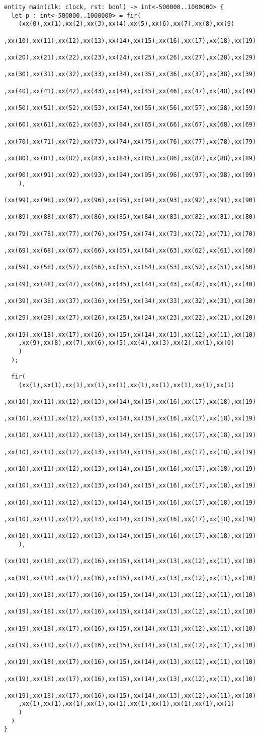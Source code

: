\documentclass[msc,lith,english]{liuthesis}
\begin{document}
\begin{verbatim}
entity main(clk: clock, rst: bool) -> int<-500000..1000000> {
  let p : int<-500000..1000000> = fir(
    (xx(0),xx(1),xx(2),xx(3),xx(4),xx(5),xx(6),xx(7),xx(8),xx(9)
    ,xx(10),xx(11),xx(12),xx(13),xx(14),xx(15),xx(16),xx(17),xx(18),xx(19)
    ,xx(20),xx(21),xx(22),xx(23),xx(24),xx(25),xx(26),xx(27),xx(28),xx(29)
    ,xx(30),xx(31),xx(32),xx(33),xx(34),xx(35),xx(36),xx(37),xx(38),xx(39)
    ,xx(40),xx(41),xx(42),xx(43),xx(44),xx(45),xx(46),xx(47),xx(48),xx(49)
    ,xx(50),xx(51),xx(52),xx(53),xx(54),xx(55),xx(56),xx(57),xx(58),xx(59)
    ,xx(60),xx(61),xx(62),xx(63),xx(64),xx(65),xx(66),xx(67),xx(68),xx(69)
    ,xx(70),xx(71),xx(72),xx(73),xx(74),xx(75),xx(76),xx(77),xx(78),xx(79)
    ,xx(80),xx(81),xx(82),xx(83),xx(84),xx(85),xx(86),xx(87),xx(88),xx(89)
    ,xx(90),xx(91),xx(92),xx(93),xx(94),xx(95),xx(96),xx(97),xx(98),xx(99)
    ),
    (xx(99),xx(98),xx(97),xx(96),xx(95),xx(94),xx(93),xx(92),xx(91),xx(90)
    ,xx(89),xx(88),xx(87),xx(86),xx(85),xx(84),xx(83),xx(82),xx(81),xx(80)
    ,xx(79),xx(78),xx(77),xx(76),xx(75),xx(74),xx(73),xx(72),xx(71),xx(70)
    ,xx(69),xx(68),xx(67),xx(66),xx(65),xx(64),xx(63),xx(62),xx(61),xx(60)
    ,xx(59),xx(58),xx(57),xx(56),xx(55),xx(54),xx(53),xx(52),xx(51),xx(50)
    ,xx(49),xx(48),xx(47),xx(46),xx(45),xx(44),xx(43),xx(42),xx(41),xx(40)
    ,xx(39),xx(38),xx(37),xx(36),xx(35),xx(34),xx(33),xx(32),xx(31),xx(30)
    ,xx(29),xx(28),xx(27),xx(26),xx(25),xx(24),xx(23),xx(22),xx(21),xx(20)
    ,xx(19),xx(18),xx(17),xx(16),xx(15),xx(14),xx(13),xx(12),xx(11),xx(10)
    ,xx(9),xx(8),xx(7),xx(6),xx(5),xx(4),xx(3),xx(2),xx(1),xx(0)
    )
  );

  fir(
    (xx(1),xx(1),xx(1),xx(1),xx(1),xx(1),xx(1),xx(1),xx(1),xx(1)
    ,xx(10),xx(11),xx(12),xx(13),xx(14),xx(15),xx(16),xx(17),xx(18),xx(19)
    ,xx(10),xx(11),xx(12),xx(13),xx(14),xx(15),xx(16),xx(17),xx(18),xx(19)
    ,xx(10),xx(11),xx(12),xx(13),xx(14),xx(15),xx(16),xx(17),xx(18),xx(19)
    ,xx(10),xx(11),xx(12),xx(13),xx(14),xx(15),xx(16),xx(17),xx(18),xx(19)
    ,xx(10),xx(11),xx(12),xx(13),xx(14),xx(15),xx(16),xx(17),xx(18),xx(19)
    ,xx(10),xx(11),xx(12),xx(13),xx(14),xx(15),xx(16),xx(17),xx(18),xx(19)
    ,xx(10),xx(11),xx(12),xx(13),xx(14),xx(15),xx(16),xx(17),xx(18),xx(19)
    ,xx(10),xx(11),xx(12),xx(13),xx(14),xx(15),xx(16),xx(17),xx(18),xx(19)
    ,xx(10),xx(11),xx(12),xx(13),xx(14),xx(15),xx(16),xx(17),xx(18),xx(19)
    ),
    (xx(19),xx(18),xx(17),xx(16),xx(15),xx(14),xx(13),xx(12),xx(11),xx(10)
    ,xx(19),xx(18),xx(17),xx(16),xx(15),xx(14),xx(13),xx(12),xx(11),xx(10)
    ,xx(19),xx(18),xx(17),xx(16),xx(15),xx(14),xx(13),xx(12),xx(11),xx(10)
    ,xx(19),xx(18),xx(17),xx(16),xx(15),xx(14),xx(13),xx(12),xx(11),xx(10)
    ,xx(19),xx(18),xx(17),xx(16),xx(15),xx(14),xx(13),xx(12),xx(11),xx(10)
    ,xx(19),xx(18),xx(17),xx(16),xx(15),xx(14),xx(13),xx(12),xx(11),xx(10)
    ,xx(19),xx(18),xx(17),xx(16),xx(15),xx(14),xx(13),xx(12),xx(11),xx(10)
    ,xx(19),xx(18),xx(17),xx(16),xx(15),xx(14),xx(13),xx(12),xx(11),xx(10)
    ,xx(19),xx(18),xx(17),xx(16),xx(15),xx(14),xx(13),xx(12),xx(11),xx(10)
    ,xx(1),xx(1),xx(1),xx(1),xx(1),xx(1),xx(1),xx(1),xx(1),xx(1)
    )
  )
}
\end{verbatim}
\end{document}

